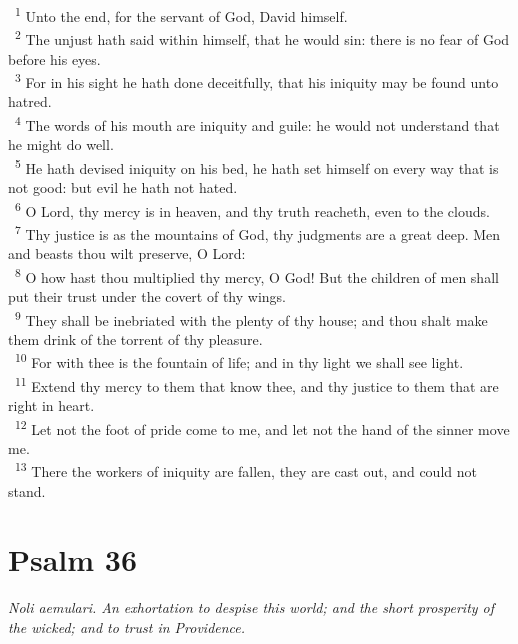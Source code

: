 \documentclass[a5paper,12pt]{article}
\begin{document}
\begin{multicols*}{2}
~\textsuperscript{1} Unto the end, for the servant of God, David himself.\\
~\textsuperscript{2} The unjust hath said within himself, that he would sin: there is no fear of God before his eyes.\\
~\textsuperscript{3} For in his sight he hath done deceitfully, that his iniquity may be found unto hatred.\\
~\textsuperscript{4} The words of his mouth are iniquity and guile: he would not understand that he might do well.\\
~\textsuperscript{5} He hath devised iniquity on his bed, he hath set himself on every way that is not good: but evil he hath not hated.\\
~\textsuperscript{6} O Lord, thy mercy is in heaven, and thy truth reacheth, even to the clouds.\\
~\textsuperscript{7} Thy justice is as the mountains of God, thy judgments are a great deep. Men and beasts thou wilt preserve, O Lord:\\
~\textsuperscript{8} O how hast thou multiplied thy mercy, O God! But the children of men shall put their trust under the covert of thy wings.\\
~\textsuperscript{9} They shall be inebriated with the plenty of thy house; and thou shalt make them drink of the torrent of thy pleasure.\\
~\textsuperscript{10} For with thee is the fountain of life; and in thy light we shall see light.\\
~\textsuperscript{11} Extend thy mercy to them that know thee, and thy justice to them that are right in heart.\\
~\textsuperscript{12} Let not the foot of pride come to me, and let not the hand of the sinner move me.\\
~\textsuperscript{13} There the workers of iniquity are fallen, they are cast out, and could not stand.\\

\section{Psalm 36}
\label{sec:orgb6e8f64}
\emph{Noli aemulari. An exhortation to despise this world; and the short prosperity of the wicked; and to trust in Providence.}\\


\end{multicols*}
\end{document}
